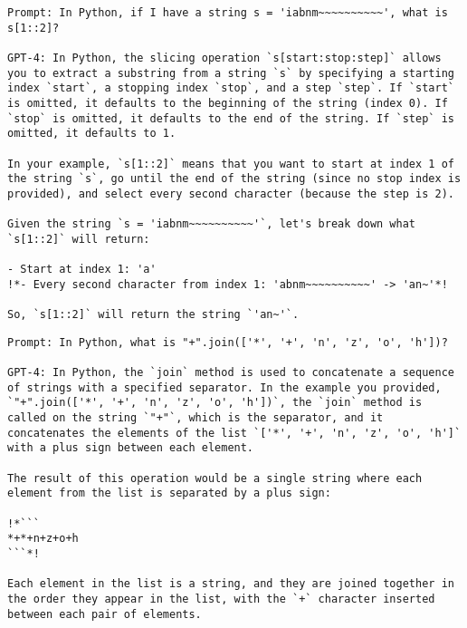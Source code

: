 \begin{lstlisting}
Prompt: In Python, if I have a string s = 'iabnm~~~~~~~~~~', what is s[1::2]?

GPT-4: In Python, the slicing operation `s[start:stop:step]` allows you to extract a substring from a string `s` by specifying a starting index `start`, a stopping index `stop`, and a step `step`. If `start` is omitted, it defaults to the beginning of the string (index 0). If `stop` is omitted, it defaults to the end of the string. If `step` is omitted, it defaults to 1.

In your example, `s[1::2]` means that you want to start at index 1 of the string `s`, go until the end of the string (since no stop index is provided), and select every second character (because the step is 2).

Given the string `s = 'iabnm~~~~~~~~~~'`, let's break down what `s[1::2]` will return:

- Start at index 1: 'a'
!*- Every second character from index 1: 'abnm~~~~~~~~~~' -> 'an~'*!

So, `s[1::2]` will return the string `'an~'`.
\end{lstlisting}

\begin{lstlisting}
Prompt: In Python, what is "+".join(['*', '+', 'n', 'z', 'o', 'h'])?

GPT-4: In Python, the `join` method is used to concatenate a sequence of strings with a specified separator. In the example you provided, `"+".join(['*', '+', 'n', 'z', 'o', 'h'])`, the `join` method is called on the string `"+"`, which is the separator, and it concatenates the elements of the list `['*', '+', 'n', 'z', 'o', 'h']` with a plus sign between each element.

The result of this operation would be a single string where each element from the list is separated by a plus sign:

!*```
*+*+n+z+o+h
```*!

Each element in the list is a string, and they are joined together in the order they appear in the list, with the `+` character inserted between each pair of elements.
\end{lstlisting}

